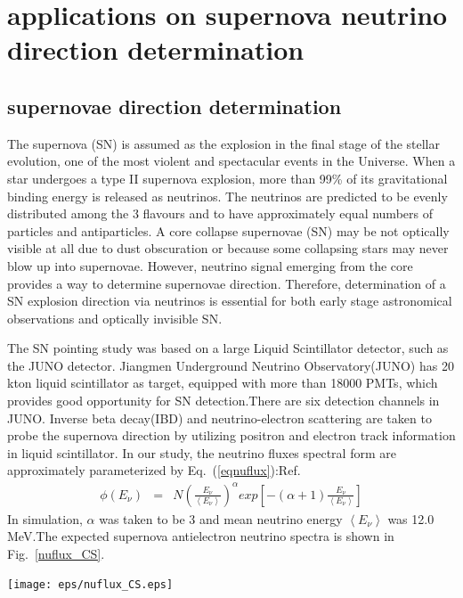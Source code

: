 \documentclass[a4paper,10pt]{cpc-hepnp}
\begin{document}
\section{applications on supernova neutrino direction determination}
\subsection{supernovae direction determination }
The supernova (SN) is assumed as the explosion in the final stage of the
stellar evolution, one of the most violent and spectacular events in the Universe.
When a star undergoes a type II supernova explosion, more than 99\% of its
gravitational binding energy is released as neutrinos. The neutrinos are predicted
to be evenly distributed among the 3 flavours and to have approximately equal
numbers of particles and antiparticles. 
A core collapse supernovae (SN) may be not optically visible at all due to
dust obscuration or because some collapsing stars may never blow up into
supernovae. However, neutrino signal emerging from the core provides a way to
determine supernovae direction. Therefore, determination of a SN explosion 
direction via neutrinos is essential for both early stage astronomical
observations and optically invisible SN.

The SN pointing study was based on a large Liquid Scintillator detector, such
as the JUNO detector.
Jiangmen Underground Neutrino Observatory(JUNO) has 20 kton liquid
scintillator as target, equipped with more than 18000 PMTs, which provides good
opportunity for SN detection.There are six detection channels in JUNO.
Inverse beta decay(IBD) and neutrino-electron scattering are taken to probe the
supernova direction by utilizing positron and electron track information in
liquid scintillator. In our study, the neutrino fluxes spectral form are 
approximately parameterized by Eq.~(\ref{eqnuflux}):Ref\cite{nuflux}.
\begin{eqnarray}
\label{eqnuflux}
\phi(E_{\nu}) &=& N\left(\frac{E_{\nu}}{ \left< E_{\nu}\right>}\right)^{\alpha}exp\left[ -(\alpha+1)\frac{E_{\nu}}{ \left< E_{\nu}\right>}\right]
\end{eqnarray}
In simulation, $\alpha$ was taken to be 3 and mean neutrino energy 
$\left< E_{\nu}\right>$ was 12.0 MeV.The expected supernova
antielectron neutrino spectra is shown in Fig.~\ref{nuflux_CS}.
\begin{center}
\texttt{[image: eps/nuflux\_CS.eps]}
\end{center}
\end{document}
